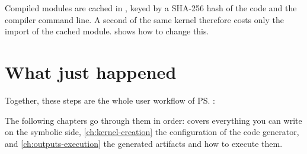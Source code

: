 \begin{note}
  Compiled modules are cached in , keyed by a SHA-256
  hash of the code and the compiler command line. A second  of the same
  kernel therefore costs only the import of the cached module.  shows how
  to change this.
\end{note}

\section{What just happened}

Together, these steps are the whole user workflow of \ps:
\begin{center}\small
{}
\end{center}
The following chapters go through them in order:
 covers everything you can write on the symbolic side,
\cref{ch:kernel-creation} the configuration of the code generator, and
\cref{ch:outputs-execution} the generated artifacts and how to execute them.
